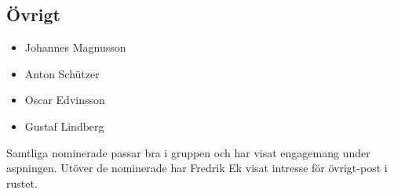 \subsection{Övrigt}
\begin{autoframe}

\begin{itemize}
\item Johannes Magnusson
\item Anton Schützer
\item Oscar Edvinsson
\item Gustaf Lindberg
\end{itemize}

\bigskip
Samtliga nominerade passar bra i gruppen och har visat engagemang under aspningen.  Utöver de nominerade har Fredrik Ek visat intresse för övrigt-post i rustet.
\end{autoframe}